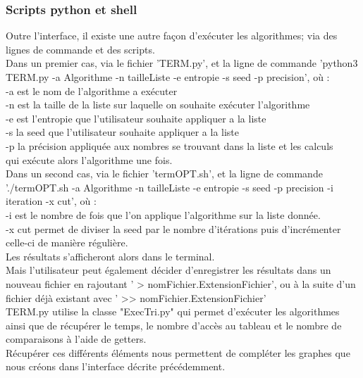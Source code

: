 \documentclass[10pt,a4paper]{article}
\begin{document}
        
        \subsubsection{Scripts python et shell}
        Outre l'interface, il existe une autre façon d'exécuter les algorithmes; via des lignes de commande et des scripts.\\
        Dans un premier cas, via le fichier 'TERM.py', et la ligne de commande 'python3 TERM.py -a Algorithme -n tailleListe -e entropie -s seed -p precision', où :\\
         -a est le nom de l'algorithme a exécuter\\
         -n est la taille de la liste sur laquelle on souhaite exécuter l'algorithme\\
         -e est l'entropie que l'utilisateur souhaite appliquer a la liste\\
         -s la seed que l'utilisateur souhaite appliquer a la liste\\
         -p la précision appliquée aux nombres se trouvant dans la liste et les calculs\\
        qui exécute alors l'algorithme une fois. \\
        Dans un second cas, via le fichier 'termOPT.sh', et la ligne de commande './termOPT.sh -a Algorithme -n tailleListe -e entropie -s seed -p precision -i iteration -x cut', où : \\
         -i est le nombre de fois que l'on applique l'algorithme sur la liste donnée.\\
         -x cut permet de diviser la seed par le nombre d'itérations puis d'incrémenter celle-ci de manière régulière. \\
        Les résultats s'afficheront alors dans le terminal. \\
        Mais l'utilisateur peut également décider d'enregistrer les résultats dans un nouveau fichier en rajoutant ' > nomFichier.ExtensionFichier', ou à la suite d'un fichier déjà existant avec ' >> nomFichier.ExtensionFichier'\\
        TERM.py utilise la classe "ExecTri.py" qui permet d'exécuter les algorithmes ainsi que de récupérer le temps, le nombre d'accès au tableau et le nombre de comparaisons à l'aide de getters.\\
        Récupérer ces différents éléments nous permettent de compléter les graphes que nous créons dans l'interface décrite précédemment.\\
\end{document}
